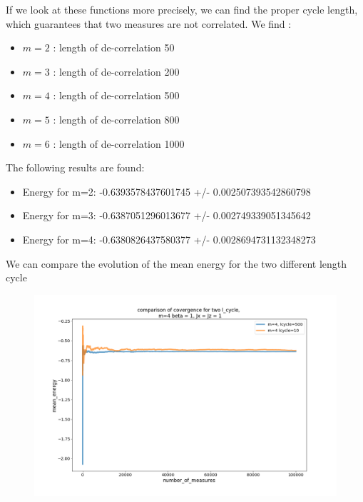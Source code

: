 \documentclass[a4paper,12pt,twoside]{article}
\begin{document}
	If we look at these functions more precisely, we can find the proper cycle length, which guarantees that two measures are not correlated.
	We find :
	\begin{itemize}
		\item[] $m=2$ : length of de-correlation 50
		\item[] $m=3$ : length of de-correlation 200
		\item[] $m=4$ : length of de-correlation 500
		\item[] $m=5$ : length of de-correlation 800
		\item[] $m=6$ : length of de-correlation 1000
	\end{itemize}


	
	The following results are found:
	\begin{itemize}
	\item[]Energy for m=2: -0.6393578437601745 +/- 0.002507393542860798
	\item[]Energy for m=3: -0.6387051296013677 +/- 0.002749339051345642
	\item[]Energy for m=4: -0.6380826437580377 +/- 0.0028694731132348273
	\end{itemize}
		 We  can compare the evolution of the mean energy for the two different length cycle
		 	\begin{figure}[!h]
		 	\centering
		 	
		 	\includegraphics[scale=0.4]{lcyclecomp.png}
		 	
		 	
		 \end{figure}



	
\end{document}
